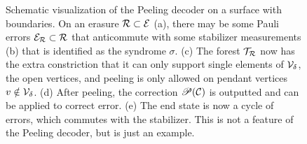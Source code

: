 \begin{figure}
    \caption{Schematic visualization of the Peeling decoder on a surface with boundaries. On an erasure $\mathcal{R}\subset \mathcal{E}$ (a), there may be some Pauli errors $\mathcal{E}_{\mathcal{R}} \subset \mathcal{R}$ that anticommute with some stabilizer measurements (b) that is identified as the syndrome $\sigma$. (c) The forest $\mathcal{T}_{\mathcal{R}}$ now has the extra constriction that it can only support single elements of $\mathcal{V}_\delta$, the open vertices, and peeling is only allowed on pendant vertices $v\notin \mathcal{V}_\delta$. (d) After peeling, the correction $\mathscr{P}(\mathcal{C})$ is outputted and can be applied to correct error. (e) The end state is now a cycle of errors, which commutes with the stabilizer. This is not a feature of the Peeling decoder, but is just an example.}
  \end{figure}